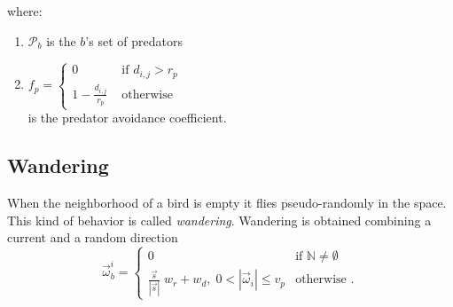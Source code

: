 \begin{enumerate}[-]
	where:
	
	\begin{enumerate}
	\item \(\mathcal{P}_b\) is the $b$'s set of predators
	\item $	f_{p} = \begin{cases}
		0 &\mbox{ if }  d_{i,j} > r_p\\
		1 - \frac{d_{i,j}}{r_p} & \mbox{ otherwise}
		\end{cases}
	$ \hfill \\
	 is the predator avoidance coefficient.
	\end{enumerate}
\end{enumerate}

\subsection{Wandering}
When the neighborhood  of a bird is empty it flies pseudo-randomly in the space. This kind of behavior is called \textit{wandering}. 
Wandering is obtained combining a current and a random direction 
\begin{equation*}
    \vec{\omega}_b^i =  
		\begin{cases} 
			0 &\mbox{if } \mathbb{N} \neq \emptyset \\ 
			\frac{\vec{s}}{|\vec{s}|}\;w_r+w_d,\; 0 < |\vec{\omega}_i| \leq v_p & \mbox{otherwise }. 
		\end{cases}
\end{equation*}
